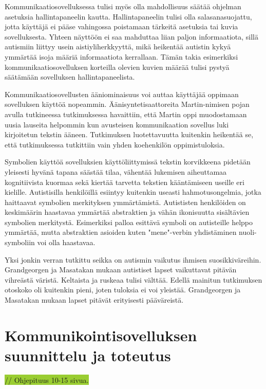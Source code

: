 \documentclass[utf8]{gradu3}
\begin{document}
Kommunikaatiosovelluksessa tulisi myös olla mahdollisuus säätää ohjelman asetuksia hallintapaneelin kautta. Hallintapaneelin tulisi olla salasanasuojattu, jotta käyttäjä ei pääse vahingossa poistamaan tärkeitä asetuksia tai kuvia sovelluksesta. Yhteen näyttöön ei saa mahduttaa liian paljon informaatiota, sillä autismiin liittyy usein aistiyliherkkyyttä, mikä heikentää autistin kykyä ymmärtää isoja määriä informaatiota kerrallaan. Tämän takia esimerkiksi kommunikaatiosovelluksen korteilla olevien kuvien määrää tulisi pystyä säätämään sovelluksen hallintapaneelista.

Kommunikaatiosovellusten ääniominaisuus voi auttaa käyttäjää oppimaan sovelluksen käyttöä nopeammin. Äänisyntetisaattoreita Martin-nimisen pojan avulla tutkineessa tutkimuksessa \parencite[]{voca-efficacy} havaittiin, että Martin oppi muodostamaan uusia lauseita helpommin kun avusteisen kommunikaation sovellus luki kirjoitetun tekstin ääneen. Tutkimuksen luotettavuutta kuitenkin heikentää se, että tutkimuksessa tutkittiin vain yhden koehenkilön oppimistuloksia.

Symbolien käyttöä sovelluksien käyttöliittymissä tekstin korvikkeena pidetään yleisesti hyvänä tapana säästää tilaa, vähentää lukemisen aiheuttamaa kognitiivista kuormaa sekä kiertää tarvetta tekstien kääntämiseen useille eri kielille. Autistisilla henkilöillä esiintyy kuitenkin useasti hahmotusongelmia, jotka haittaavat symbolien merkityksen ymmärtämistä. Autististen henkilöiden on keskimäärin haastavaa ymmärtää abstraktien ja vähän ikonisuutta sisältävien symbolien merkitystä. Esimerkiksi palloa esittävä symboli on autisteille helppo ymmärtää, mutta abstraktien asioiden kuten "mene"-verbin yhdistäminen nuoli-symboliin voi olla haastavaa. \parencite[]{symbol-acquisition-autism}

Yksi jonkin verran tutkittu seikka on autismin vaikutus ihmisen suosikkiväreihin. Grandgeorgen ja Masatakan \parencite[]{color-preference-autism} mukaan autistiset lapset vaikuttavat pitävän vihreästä väristä. Keltaista ja ruskeaa tulisi välttää. Edellä mainitun tutkimuksen otoskoko oli kuitenkin pieni, joten tuloksia ei voi yleistää. Grandgeorgen ja Masatakan mukaan lapset pitävät erityisesti pääväreistä.

\chapter{Kommunikointisovelluksen suunnittelu ja toteutus}
\colorbox{YellowGreen}{// Ohjepituus 10-15 sivua.}
\end{document}
